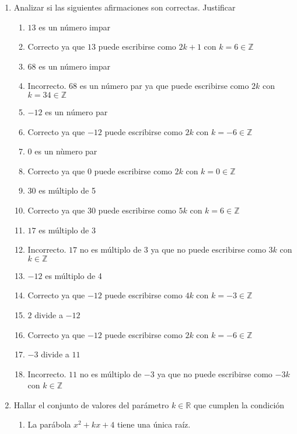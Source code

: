 \documentclass[a4paper]{article}
\newcommand{\answer}{\item[**]}
\newcommand{\exercise}{\item}
\begin{document}
\begin{enumerate}
	\exercise Analizar si las siguientes afirmaciones son correctas. Justificar
	\begin{multicols}{2}
	\begin{enumerate} [label=(\alph*)]
		\item $13$ es un número impar
		\answer Correcto ya que $13$ puede escribirse como $2k+1$ con $k=6 \in \mathbb{Z}$

		\item $68$ es un número impar
		\answer Incorrecto. $68$ es un número par ya que puede escribirse como $2k$ con $k=34 \in \mathbb{Z}$

		\item $-12$ es un número par
		\answer Correcto ya que $-12$ puede escribirse como $2k$ con $k=-6 \in \mathbb{Z}$

		\item $0$ es un nùmero par
		\answer Correcto ya que $0$ puede escribirse como $2k$ con $k=0 \in \mathbb{Z}$

		\item $30$ es múltiplo de 5
		\answer Correcto ya que $30$ puede escribirse como $5k$ con $k=6 \in \mathbb{Z}$

		\item $17$ es múltiplo de 3
		\answer Incorrecto. $17$ no es múltiplo de 3 ya que no puede escribirse como $3k$ con $k \in \mathbb{Z}$

		\item $-12$ es múltiplo de 4
		\answer Correcto ya que $-12$ puede escribirse como $4k$ con $k=-3 \in \mathbb{Z}$

		\item $2$ divide a $-12$
		\answer Correcto ya que $-12$ puede escribirse como $2k$ con $k=-6 \in \mathbb{Z}$

		\item $-3$ divide a $11$
		\answer Incorrecto. $11$ no es múltiplo de $-3$ ya que no puede escribirse como $-3k$ con $k \in \mathbb{Z}$

	\end{enumerate}
	\end{multicols}

	\exercise Hallar el conjunto de valores del parámetro $k \in \mathbb{R}$ que cumplen la condición
	\begin{enumerate} [label=(\alph*)]

		\item La parábola $x^2+kx+4$ tiene una única raíz.


\end{enumerate}
\end{enumerate}
\end{document}
